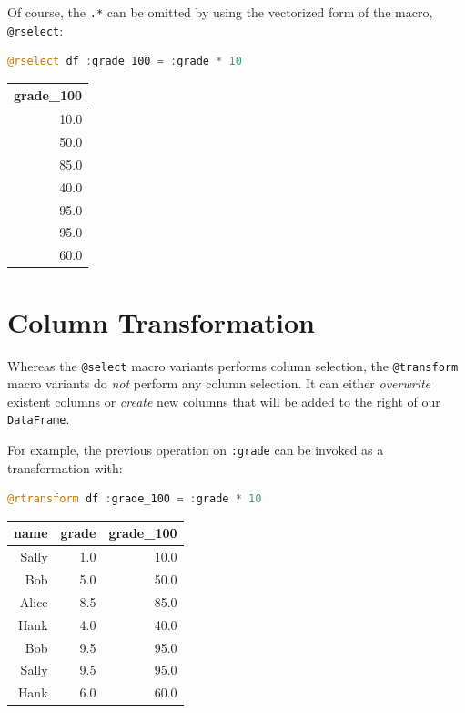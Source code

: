 \documentclass[
  notoc %
]{tufte-book}
\newcommand{\passthrough}[1]{#1}
\begin{document}
Of course, the \passthrough{\lstinline!.*!} can be omitted by using the
vectorized form of the macro, \passthrough{\lstinline!@rselect!}:

\begin{lstlisting}[language=Julia]
@rselect df :grade_100 = :grade * 10
\end{lstlisting}

\begin{longtable}[]{@{}r@{}}
\toprule()
grade\_100 \\
\midrule()
\endhead
10.0 \\
50.0 \\
85.0 \\
40.0 \\
95.0 \\
95.0 \\
60.0 \\
\bottomrule()
\end{longtable}

\hypertarget{sec:dataframesmeta_transform}{%
\section{Column Transformation}\label{sec:dataframesmeta_transform}}

Whereas the \passthrough{\lstinline!@select!} macro variants performs
column selection, the \passthrough{\lstinline!@transform!} macro
variants do \emph{not} perform any column selection. It can either
\emph{overwrite} existent columns or \emph{create} new columns that will
be added to the right of our \passthrough{\lstinline!DataFrame!}.

For example, the previous operation on \passthrough{\lstinline!:grade!}
can be invoked as a transformation with:

\begin{lstlisting}[language=Julia]
@rtransform df :grade_100 = :grade * 10
\end{lstlisting}

\begin{longtable}[]{@{}rrr@{}}
\toprule()
name & grade & grade\_100 \\
\midrule()
\endhead
Sally & 1.0 & 10.0 \\
Bob & 5.0 & 50.0 \\
Alice & 8.5 & 85.0 \\
Hank & 4.0 & 40.0 \\
Bob & 9.5 & 95.0 \\
Sally & 9.5 & 95.0 \\
Hank & 6.0 & 60.0 \\
\bottomrule()
\end{longtable}
\end{document}
